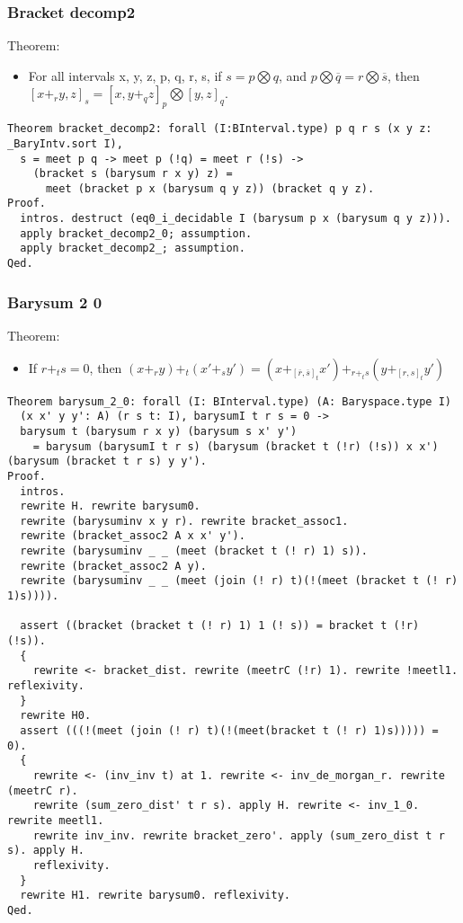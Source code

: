 \documentclass[a4paper,10pt]{article} %
\begin{document}
\subsubsection{Bracket decomp2}
Theorem:
\begin{itemize}
    \item For all intervals x, y, z, p, q, r, s, if $s = p \bigotimes q$, and $p \bigotimes \overline{q} = r \bigotimes \overline{s}$, then $[x + _ry, z]_s = [x, y + _qz]_p \bigotimes [y, z]_q$.
\end{itemize}
\begin{lstlisting}
Theorem bracket_decomp2: forall (I:BInterval.type) p q r s (x y z: _BaryIntv.sort I),
  s = meet p q -> meet p (!q) = meet r (!s) ->  
    (bracket s (barysum r x y) z) = 
      meet (bracket p x (barysum q y z)) (bracket q y z).
Proof.
  intros. destruct (eq0_i_decidable I (barysum p x (barysum q y z))).
  apply bracket_decomp2_0; assumption.
  apply bracket_decomp2_; assumption.
Qed.
\end{lstlisting}

\subsubsection{Barysum 2 0}
Theorem:
\begin{itemize}
    \item If $r + _ts = 0$, then $(x + _ry) + _t(x' + _sy') = (x + _{[\overline{r}, \overline{s}]_t}x') + _{r + _ts}(y + _{[r, s]_t}y')$
\end{itemize}
\begin{lstlisting}
Theorem barysum_2_0: forall (I: BInterval.type) (A: Baryspace.type I) 
  (x x' y y': A) (r s t: I), barysumI t r s = 0 -> 
  barysum t (barysum r x y) (barysum s x' y')
    = barysum (barysumI t r s) (barysum (bracket t (!r) (!s)) x x') (barysum (bracket t r s) y y').
Proof.
  intros. 
  rewrite H. rewrite barysum0. 
  rewrite (barysuminv x y r). rewrite bracket_assoc1.
  rewrite (bracket_assoc2 A x x' y'). 
  rewrite (barysuminv _ _ (meet (bracket t (! r) 1) s)). 
  rewrite (bracket_assoc2 A y).
  rewrite (barysuminv _ _ (meet (join (! r) t)(!(meet (bracket t (! r) 1)s)))).

  assert ((bracket (bracket t (! r) 1) 1 (! s)) = bracket t (!r) (!s)).
  {
    rewrite <- bracket_dist. rewrite (meetrC (!r) 1). rewrite !meetl1. reflexivity.
  }
  rewrite H0.
  assert (((!(meet (join (! r) t)(!(meet(bracket t (! r) 1)s))))) = 0).
  {
    rewrite <- (inv_inv t) at 1. rewrite <- inv_de_morgan_r. rewrite (meetrC r). 
    rewrite (sum_zero_dist' t r s). apply H. rewrite <- inv_1_0.  rewrite meetl1.
    rewrite inv_inv. rewrite bracket_zero'. apply (sum_zero_dist t r s). apply H.
    reflexivity.
  }
  rewrite H1. rewrite barysum0. reflexivity.
Qed.
\end{lstlisting}
\end{document}
